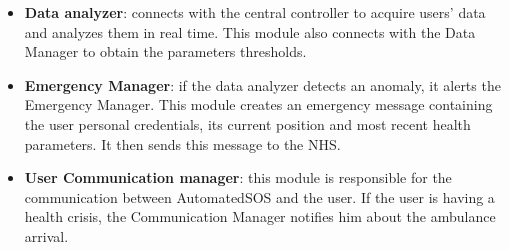 \begin{itemize}
    \item \textbf{Data analyzer}: connects with the central controller to acquire users' data and analyzes them in real time. This module also connects with the Data Manager to obtain the parameters thresholds.
    \item \textbf{Emergency Manager}: if the data analyzer detects an anomaly, it alerts the Emergency Manager. This module creates an emergency message containing the user personal credentials, its current position and most recent health parameters. It then sends this message to the NHS.
    \item \textbf{User Communication manager}: this module is responsible for the communication between AutomatedSOS and the user. If the user is having a health crisis, the Communication Manager notifies him about the ambulance arrival.
\end{itemize}
\clearpage
